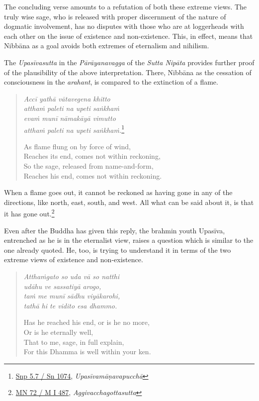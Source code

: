 The concluding verse amounts to a refutation of both these extreme views. The truly wise sage, who is released with proper discernment of the nature of dogmatic involvement, has no disputes with those who are at loggerheads with each other on the issue of existence and non-existence. This, in effect, means that Nibbāna as a goal avoids both extremes of eternalism and nihilism.

The \emph{Upasīvasutta} in the \emph{Pārāyanavagga} of the \emph{Sutta Nipāta} provides further proof of the plausibility of the above interpretation. There, Nibbāna as the cessation of consciousness in the \emph{arahant}, is compared to the extinction of a flame.

\begin{quote}
\emph{Accī yathā vātavegena khitto}\\
\emph{atthaṁ paleti na upeti saṅkhaṁ}\\
\emph{evaṁ munī nāmakāyā vimutto}\\
\emph{atthaṁ paleti na upeti saṅkhaṁ.}\footnote{\href{https://suttacentral.net/snp5.7/pli/ms}{Snp 5.7 / Sn 1074}, \emph{Upasīvamāṇavapucchā}}

\clearpage

As flame flung on by force of wind,\\
Reaches its end, comes not within reckoning,\\
So the sage, released from name-and-form,\\
Reaches his end, comes not within reckoning.
\end{quote}

When a flame goes out, it cannot be reckoned as having gone in any of the directions, like north, east, south, and west. All what can be said about it, is that it has gone out.\footnote{\href{https://suttacentral.net/mn72/pli/ms}{MN 72 / M I 487}, \emph{Aggivacchagottasutta}}

Even after the Buddha has given this reply, the brahmin youth Upasīva, entrenched as he is in the eternalist view, raises a question which is similar to the one already quoted. He, too, is trying to understand it in terms of the two extreme views of existence and non-existence.

\begin{quote}
\emph{Atthaṁgato so uda vā so natthi}\\
\emph{udāhu ve sassatiyā arogo,}\\
\emph{taṁ me munī sādhu viyākarohi,}\\
\emph{tathā hi te vidito esa dhammo.}

Has he reached his end, or is he no more,\\
Or is he eternally well,\\
That to me, sage, in full explain,\\
For this Dhamma is well within your ken.
\end{quote}

